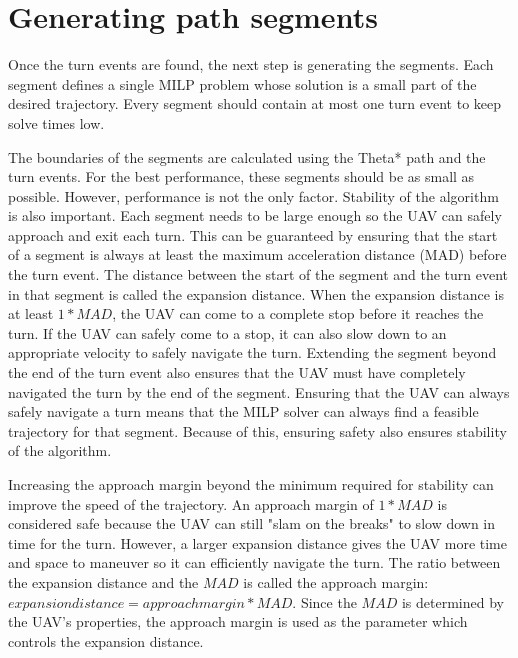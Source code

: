 \section{Generating path segments}

Once the turn events are found, the next step is generating the segments. Each segment defines a single MILP problem whose solution is a small part of the desired trajectory. Every segment should contain at most one turn event to keep solve times low.
\par
The boundaries of the segments are calculated using the Theta* path and the turn events. For the best performance, these segments should be as small as possible. However, performance is not the only factor. Stability of the algorithm is also important. Each segment needs to be large enough so the UAV can safely approach and exit each turn. This can be guaranteed by ensuring that the start of a segment is always at least the maximum acceleration distance (MAD) before the turn event. The distance between the start of the segment and the turn event in that segment is called the expansion distance. When the expansion distance is at least $1*MAD$, the UAV can come to a complete stop before it reaches the turn. If the UAV can safely come to a stop, it can also slow down to an appropriate velocity to safely navigate the turn. Extending the segment beyond the end of the turn event also ensures that the UAV must have completely navigated the turn by the end of the segment. Ensuring that the UAV can always safely navigate a turn means that the MILP solver can always find a feasible trajectory for that segment. Because of this, ensuring  safety also ensures stability of the algorithm. 
\par
Increasing the approach margin beyond the minimum required for stability can improve the speed of the trajectory. An approach margin of $1*MAD$ is considered safe because the UAV can still "slam on the breaks" to slow down in time for the turn. However, a larger expansion distance gives the UAV more time and space to maneuver so it can efficiently navigate the turn. The ratio between the expansion distance and the $MAD$ is called the approach margin: $expansion distance = approach margin * MAD$. Since the $MAD$ is determined by the UAV's properties, the approach margin is used as the parameter which controls the expansion distance.


